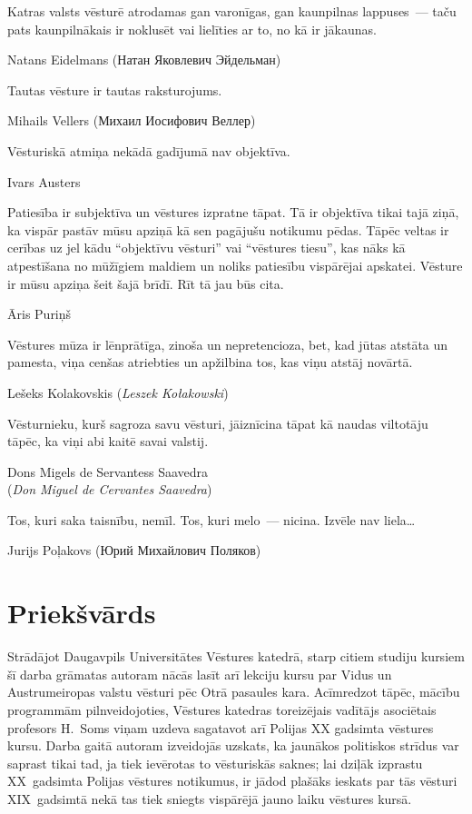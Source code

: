 \documentclass[twoside,a5paper,12pt,fleqn,openany]{extbook}
\newcommand{\pltxti}[1]{\textit{\textpolish{#1}}}
\newcommand{\rutxti}[1]{\textrussian{#1}}
\newcommand{\estxti}[1]{\textit{\textspanish{#1}}}
\begin{document}
\epigraph
{Katras valsts vēsturē atrodamas gan varonīgas, gan kaunpilnas lappuses~--- taču pats kaunpilnākais ir noklusēt vai lielīties ar to, no kā ir jākaunas.}
{Natans Eidelmans (\rutxti{Натан Яковлевич Эйдельман})}

\epigraph
{Tautas vēsture ir tautas raksturojums.}
{Mihails Vellers (\rutxti{Михаил Иосифович Веллер})}

\epigraph
{Vēsturiskā atmiņa nekādā gadījumā nav objektīva.}
{Ivars Austers}



\epigraph
{Patiesība ir subjektīva un vēstures izpratne tāpat.
Tā ir objektīva tikai tajā ziņā, ka vispār pastāv mūsu apziņā kā sen pagājušu notikumu pēdas.
Tāpēc veltas ir cerības uz jel kādu ``objektīvu vēsturi” vai ``vēstures tiesu”, kas nāks kā atpestīšana no mūžīgiem maldiem un noliks patiesību vispārējai apskatei.
Vēsture ir mūsu apziņa šeit šajā brīdī.
Rīt tā jau būs cita.}
{Āris Puriņš}

\epigraph
{Vēstures mūza ir lēnprātīga, zinoša un nepretencioza, bet, kad jūtas atstāta un pamesta, viņa cenšas atriebties un apžilbina tos, kas viņu atstāj novārtā.}
{Lešeks Kolakovskis (\pltxti{Leszek Kołakowski})}

\epigraph
{Vēsturnieku, kurš sagroza savu vēsturi, jāiznīcina tāpat kā naudas viltotāju tāpēc, ka viņi abi kaitē savai valstij.}
{Dons Migels de Servantess Saavedra\\(\estxti{Don Miguel de Cervantes Saavedra})}

\epigraph
{Tos, kuri saka taisnību, nemīl.
Tos, kuri melo~--- nicina.
Izvēle nav liela\ldots{}}
{Jurijs Poļakovs (\rutxti{Юрий Михайлович Поляков})}

\tableofcontents

\chapter*{Priekšvārds}

Strādājot Daugavpils Universitātes Vēstures katedrā, starp citiem studiju kursiem šī darba grāmatas autoram nācās lasīt arī lekciju kursu par Vidus un Austrumeiropas valstu vēsturi pēc Otrā pasaules kara.
Acīmredzot tāpēc, mācību programmām pilnveidojoties, Vēstures katedras toreizējais vadītājs asociētais profesors H.~Soms viņam uzdeva sagatavot arī Polijas XX gadsimta vēstures kursu.
Darba gaitā autoram izveidojās uzskats, ka jaunākos politiskos strīdus var saprast tikai tad, ja tiek ievērotas to vēsturiskās saknes; lai dziļāk izprastu XX~gadsimta Polijas vēstures notikumus, ir jādod plašāks ieskats par tās vēsturi XIX~gadsimtā nekā tas tiek sniegts vispārējā jauno laiku vēstures kursā.
\end{document}
